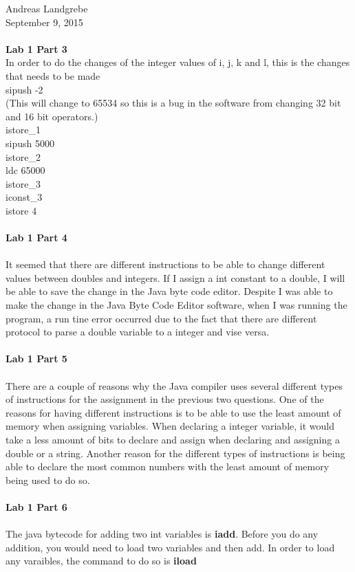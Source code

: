 \documentclass{article}
\begin{document}
\noindent
Andreas Landgrebe
\\
September 9, 2015
\\
\\
\textbf{Lab 1 Part 3}
\\
In order to do the changes of the integer values of i, j, k and l, this is the changes that needs to be made
\\
sipush -2 
\\
(This will change to 65534 so this is a bug in the software from changing 32 bit and 16 bit operators.)
\\
istore\_1
\\
sipush 5000
\\
istore\_2
\\
ldc 65000
\\
istore\_3
\\
iconst\_3
\\
istore 4
\\
\\
\textbf{Lab 1 Part 4}
\\
\\
It seemed that there are different instructions to be able to change different values between doubles and integers. If I assign a int constant to a double, I will be able to save the change in the Java byte code editor. Despite I was able to make the change in the Java Byte Code Editor software, when I was running the program, a run tine error occurred due to the fact that there are different protocol to parse a double variable to a integer and vise versa. 
\\
\\
\textbf{Lab 1 Part 5}
\\
\\
There are a couple of reasons why the Java compiler uses several different types of instructions for the assignment in the previous two questions. One of the reasons for having different instructions is to be able to use the least amount of memory when assigning variables. When declaring a integer variable, it would take a less amount of bits to declare and assign when declaring and assigning a double or a string. Another reason for the different types of instructions is being able to declare the most common numbers with the least amount of memory being used to do so. 
\\
\\
\textbf{Lab 1 Part 6}
\\
\\
The java bytecode for adding two int variables is \textbf{iadd}. Before you do any addition, you would need to load two variables and then add. In order to load any varaibles, the command to do so is \textbf{iload}
\end{document}
